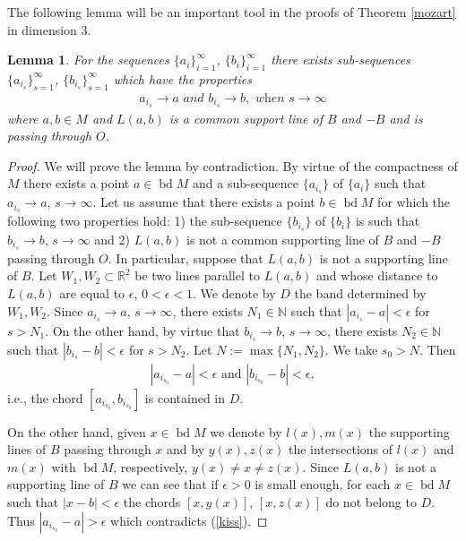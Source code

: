 \documentclass[12pt]{amsart}
\newcommand{\bd}{\operatorname*{bd}}
\newcommand{\Rd}{\mathbb{R}^2}
\newtheorem{lemma}{Lemma}
\begin{document}
           The following lemma will be an important tool in the proofs of Theorem \ref{mozart} in
            dimension 3.  
\begin{lemma}\label{star}
                For the sequences $\{a_i\}_{i=1} ^\infty$, $\{b_i\}_{i=1} ^\infty$ there 
                exists sub-sequences 
                $\{a_{i_s}\}_{s=1} ^\infty$, $\{b_{i_s}\}_{s=1} ^\infty$ which have the 
                properties  
\begin{eqnarray}\label{viri}
a_{i_s} \rightarrow a  \textit{ and } b_{i_s}\rightarrow b, \textit{ when } s\rightarrow \infty
\end{eqnarray} 
                where $a,b\in M$ and $L(a,b)$ is a common support line of $B$ 
                and $-B$ and is passing through $O$. 
\end{lemma}
\begin{proof}
             We will prove the lemma by contradiction. By virtue of the 
             compactness of $M$ there exists a point $a\in \bd M$ and a 
             sub-sequence $\{a_{i_s}\}$ of $\{a_i\}$ such that 
             $a_{i_s}\rightarrow a$, $s\rightarrow \infty$. Let us assume that 
             there exists a point $b\in \bd M$ for which the following two properties 
             hold: 1) the sub-sequence $\{b_{i_s}\}$ of $\{b_i\}$ is such that 
             $b_{i_s}\rightarrow b$, $s\rightarrow \infty$ and 2) $L(a,b)$ is not a 
             common supporting line of $B$ and $-B$ passing through $O$. In 
             particular, suppose that $L(a,b)$ is not a supporting line of $B$. Let 
             $W_1,W_2\subset \Rd$ be two lines parallel to $L(a,b)$ and whose 
             distance to $L(a,b) $ are equal to $\epsilon$, $0<\epsilon<1$. We 
             denote by $D$ the band determined by $W_1,W_2$. Since 
             $a_{i_s}\rightarrow a$, $s\rightarrow \infty$, there exists 
             $N_1\in \mathbb{N}$ such that $|a_{i_s} - a|<\epsilon$ for $s>N_1$. 
             On the other hand, by virtue that $b_{i_s}\rightarrow b$, 
             $s\rightarrow \infty$, there exists $N_2\in \mathbb{N}$ such that 
             $|b_{i_s} - b|<\epsilon$ for $s>N_2$. Let $N:=\max \{N_1,N_2\}$. 
             We take $s_0>N$. Then
\begin{eqnarray}\label{kiss}
             |a_{i_{s_0}}-a|<\epsilon \textrm{ and }|b_{i_{s_0}}-b|<\epsilon,
\end{eqnarray}
              i.e., the chord $[a_{i_{s_0}},b_{i_{s_0}}]$ is contained in $D$.
 
              On the other hand, given $x\in \bd M$ we denote by $l(x),m(x)$ the 
              supporting lines of $B$ passing through $x$ and by $y(x), z(x)$ the 
              intersections of $l(x)$ and $m(x)$ with $\bd M$, respectively, 
              $y(x)\not=x\not= z(x)$. Since $L(a,b)$ is not a supporting line of 
              $B$ we can see that if $\epsilon>0$ is small enough, for each 
              $x\in \bd M$ such that $|x-b|<\epsilon$ the chords $[x,y(x)]$, 
              $[x,z(x)]$ do not belong to $D$. Thus $|a_{i_{s_0}}-a|>\epsilon$ 
              which contradicts (\ref{kiss}).  


\end{proof}
\end{document}
